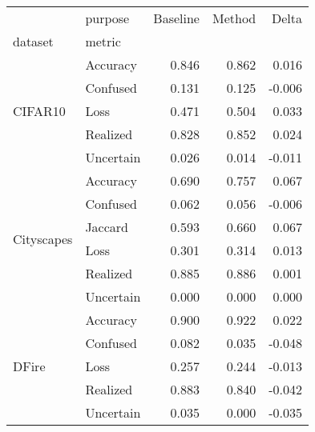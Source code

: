 \begin{tabular}{llrrr}
\toprule
 & purpose & Baseline & Method & Delta \\
dataset & metric &  &  &  \\
\midrule
\multirow[t]{5}{*}{CIFAR10} & Accuracy & 0.846 & 0.862 & 0.016 \\
 & Confused & 0.131 & 0.125 & -0.006 \\
 & Loss & 0.471 & 0.504 & 0.033 \\
 & Realized & 0.828 & 0.852 & 0.024 \\
 & Uncertain & 0.026 & 0.014 & -0.011 \\
\cline{1-5}
\multirow[t]{6}{*}{Cityscapes} & Accuracy & 0.690 & 0.757 & 0.067 \\
 & Confused & 0.062 & 0.056 & -0.006 \\
 & Jaccard & 0.593 & 0.660 & 0.067 \\
 & Loss & 0.301 & 0.314 & 0.013 \\
 & Realized & 0.885 & 0.886 & 0.001 \\
 & Uncertain & 0.000 & 0.000 & 0.000 \\
\cline{1-5}
\multirow[t]{5}{*}{DFire} & Accuracy & 0.900 & 0.922 & 0.022 \\
 & Confused & 0.082 & 0.035 & -0.048 \\
 & Loss & 0.257 & 0.244 & -0.013 \\
 & Realized & 0.883 & 0.840 & -0.042 \\
 & Uncertain & 0.035 & 0.000 & -0.035 \\
\cline{1-5}
\bottomrule
\end{tabular}
